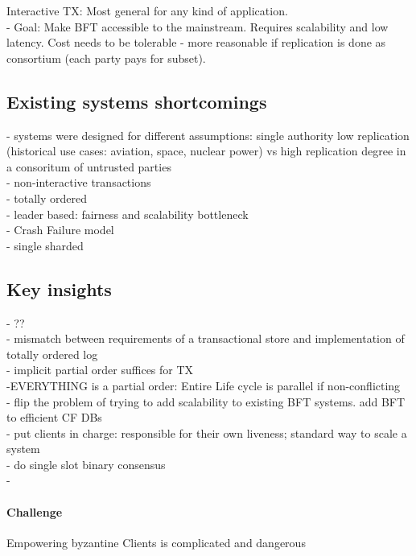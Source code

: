  Interactive TX: Most general for any kind of application.
\\
 - Goal: Make BFT accessible to the mainstream. Requires scalability and low latency. Cost needs to be tolerable - more reasonable if replication is done as consortium (each party pays for subset).
 

\subsection{Existing systems shortcomings}
- systems were designed for different assumptions: single authority low replication (historical use cases: aviation, space, nuclear power) vs high replication degree in a consoritum of untrusted parties\\
- non-interactive transactions\\
- totally ordered\\
- leader based: fairness and scalability bottleneck \\
- Crash Failure model\\
- single sharded\\

\subsection{Key insights}
- ?? \\
- mismatch between requirements of a transactional store and implementation of totally ordered log\\
- implicit partial order suffices for TX 
\\
-EVERYTHING is a partial order: Entire Life cycle is parallel if non-conflicting\\

- flip the problem of trying to add scalability to existing BFT systems. add BFT to efficient CF DBs\\

- put clients in charge: responsible for their own liveness;  standard way to scale a system\\
- do single slot binary consensus\\
-
\paragraph{Challenge} Empowering byzantine Clients is complicated and dangerous


